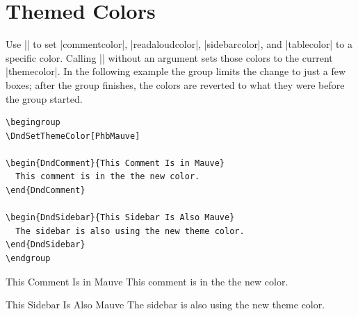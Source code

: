 \documentclass[letterpaper,twocolumn,openany,nodeprecatedcode]{dndbook}
\begin{document}
\section{Themed Colors}
Use |\DndSetThemeColor[<color>]| to set |commentcolor|, |readaloudcolor|, |sidebarcolor|, and |tablecolor| to a specific color. Calling |\DndSetThemeColor| without an argument sets those colors to the current |themecolor|. In the following example the group limits the change to just a few boxes; after the group finishes, the colors are reverted to what they were before the group started.

\begin{lstlisting}
\begingroup
\DndSetThemeColor[PhbMauve]

\begin{DndComment}{This Comment Is in Mauve}
  This comment is in the the new color.
\end{DndComment}

\begin{DndSidebar}{This Sidebar Is Also Mauve}
  The sidebar is also using the new theme color.
\end{DndSidebar}
\endgroup
\end{lstlisting}

\begingroup
\DndSetThemeColor[PhbMauve]

\begin{DndComment}{This Comment Is in Mauve}
  This comment is in the the new color.
\end{DndComment}

\begin{DndSidebar}{This Sidebar Is Also Mauve}
  The sidebar is also using the new theme color.
\end{DndSidebar}
\endgroup
\end{document}
